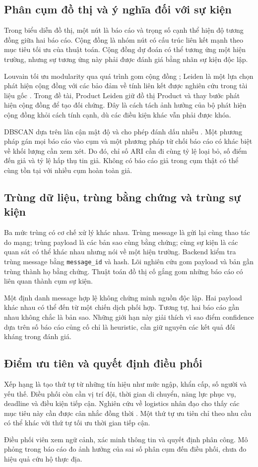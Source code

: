 \subsection{Phân cụm đồ thị và ý nghĩa đối với sự kiện}
Trong biểu diễn đồ thị, một nút là báo cáo và trọng số cạnh thể hiện độ tương đồng giữa hai báo cáo. Cộng đồng là nhóm nút có cấu trúc liên kết mạnh theo mục tiêu tối ưu của thuật toán. Cộng đồng dự đoán có thể tương ứng một hiện trường, nhưng sự tương ứng này phải được đánh giá bằng nhãn sự kiện độc lập.

Louvain tối ưu modularity qua quá trình gom cộng đồng \citep{blondel2008louvain}; Leiden là một lựa chọn phát hiện cộng đồng với các bảo đảm về tính liên kết được nghiên cứu trong tài liệu gốc \citep{traag2019leiden}. Trong đề tài, Product Leiden giữ đồ thị Product và thay bước phát hiện cộng đồng để tạo đối chứng. Đây là cách tách ảnh hưởng của bộ phát hiện cộng đồng khỏi cách tính cạnh, dù các điều kiện khác vẫn phải được khóa.

DBSCAN dựa trên lân cận mật độ và cho phép đánh dấu nhiễu \citep{ester1996dbscan}. Một phương pháp gán mọi báo cáo vào cụm và một phương pháp từ chối báo cáo có khác biệt về khối lượng cần xem xét. Do đó, chỉ số ARI cần đi cùng tỷ lệ loại bỏ, số điểm đến giả và tỷ lệ hấp thụ tin giả. Không có báo cáo giả trong cụm thật có thể cùng tồn tại với nhiều cụm hoàn toàn giả.

\subsection{Trùng dữ liệu, trùng bằng chứng và trùng sự kiện}
Ba mức trùng có cơ chế xử lý khác nhau. Trùng message là gửi lại cùng thao tác do mạng; trùng payload là các bản sao cùng bằng chứng; cùng sự kiện là các quan sát có thể khác nhau nhưng nói về một hiện trường. Backend kiểm tra trùng message bằng \texttt{message\_id} và hash. Lõi nghiên cứu gom payload và bản gần trùng thành họ bằng chứng. Thuật toán đồ thị cố gắng gom những báo cáo có liên quan thành cụm sự kiện.

Một định danh message hợp lệ không chứng minh nguồn độc lập. Hai payload khác nhau có thể đến từ một chiến dịch phối hợp. Tương tự, hai báo cáo gần nhau không chắc là bản sao. Những giới hạn này giải thích vì sao điểm confidence dựa trên số báo cáo củng cố chỉ là heuristic, cần giữ nguyên các kết quả đối kháng trong đánh giá.

\subsection{Điểm ưu tiên và quyết định điều phối}
Xếp hạng là tạo thứ tự từ những tín hiệu như mức ngập, khẩn cấp, số người và yếu thế. Điều phối còn cần vị trí đội, thời gian di chuyển, năng lực phục vụ, deadline và điều kiện tiếp cận. Nghiên cứu về logistics nhân đạo cho thấy các mục tiêu này cần được cân nhắc đồng thời \citep{gralla2014review}. Một thứ tự ưu tiên chỉ theo nhu cầu có thể khác với thứ tự tối ưu thời gian tiếp cận.

Điều phối viên xem ngữ cảnh, xác minh thông tin và quyết định phân công. Mô phỏng trong báo cáo đo ảnh hưởng của sai số phân cụm đến điều phối, chưa đo hiệu quả cứu hộ thực địa.
